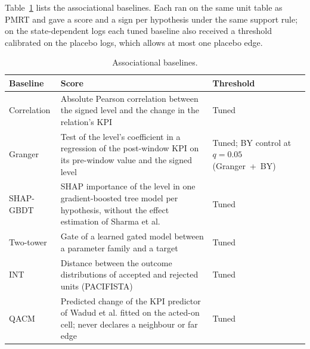 \documentclass[pdflatex,sn-mathphys-num]{sn-jnl}%
\theoremstyle{thmstyleone}%
\theoremstyle{thmstyletwo}%
\theoremstyle{thmstylethree}%
\begin{document}
\begin{table}[tbp]
\caption{Knockout ground truth of the 60 hypotheses, uniform-randomised logs.}
\label{tab:s_hyp}

\end{table}

Table~\ref{tab:s_baselines} lists the associational baselines. Each ran on the same unit table as PMRT and gave a score and a sign per hypothesis under the same support rule; on the state-dependent logs each tuned baseline also received a threshold calibrated on the placebo logs, which allows at most one placebo edge.

\begin{table}
\caption{Associational baselines.}
\label{tab:s_baselines}
\footnotesize
\setlength{\tabcolsep}{3pt}
\begin{tabular*}{\textwidth}{@{\extracolsep{\fill}}>{\raggedright}p{}>{\raggedright}p{}>{\raggedright\arraybackslash}p{}@{}}
\toprule
Baseline & Score & Threshold \\
\midrule
Correlation & Absolute Pearson correlation between the signed level and the change in the relation's KPI & Tuned \\
Granger & Test of the level's coefficient in a regression of the post-window KPI on its pre-window value and the signed level & Tuned; BY control at $q = 0.05$ (Granger~+~BY) \\
SHAP-GBDT & SHAP importance of the level in one gradient-boosted tree model per hypothesis, without the effect estimation of Sharma et al. & Tuned \\
Two-tower & Gate of a learned gated model between a parameter family and a target & Tuned \\
INT & Distance between the outcome distributions of accepted and rejected units (PACIFISTA) & Tuned \\
QACM & Predicted change of the KPI predictor of Wadud et al. fitted on the acted-on cell; never declares a neighbour or far edge & Tuned \\
\bottomrule
\end{tabular*}
\end{table}
\end{document}
